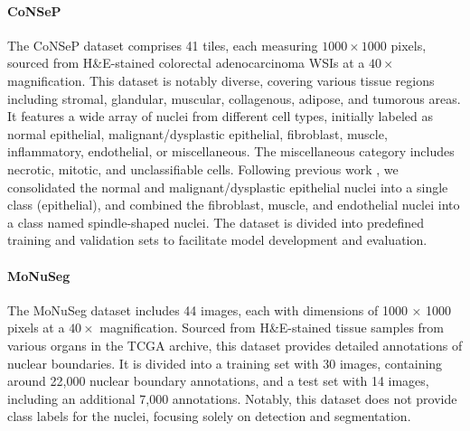 
\paragraph{CoNSeP}
The CoNSeP dataset \cite{graham2019hover} comprises 41 tiles, each measuring $1000 \times 1000$ pixels, sourced from H\&E-stained colorectal adenocarcinoma WSIs at a $40 \times$ magnification. This dataset is notably diverse, covering various tissue regions including stromal, glandular, muscular, collagenous, adipose, and tumorous areas. It features a wide array of nuclei from different cell types, initially labeled as normal epithelial, malignant/dysplastic epithelial, fibroblast, muscle, inflammatory, endothelial, or miscellaneous. The miscellaneous category includes necrotic, mitotic, and unclassifiable cells. Following previous work \cite{graham2019hover}, we consolidated the normal and malignant/dysplastic epithelial nuclei into a single class (epithelial), and combined the fibroblast, muscle, and endothelial nuclei into a class named spindle-shaped nuclei. The dataset is divided into predefined training and validation sets to facilitate model development and evaluation.

\paragraph{MoNuSeg}
The MoNuSeg dataset \cite{kumar2019multi} includes 44 images, each with dimensions of 1000 × 1000 pixels at a $40 \times$ magnification. Sourced from H\&E-stained tissue samples from various organs in the TCGA archive, this dataset provides detailed annotations of nuclear boundaries. It is divided into a training set with 30 images, containing around 22,000 nuclear boundary annotations, and a test set with 14 images, including an additional 7,000 annotations. Notably, this dataset does not provide class labels for the nuclei, focusing solely on detection and segmentation.

